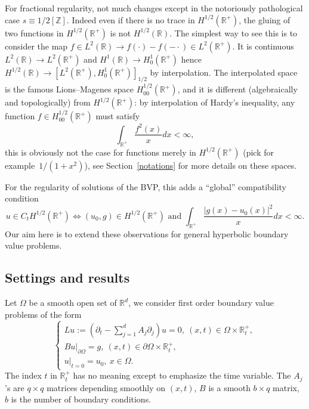 \documentclass[10pt]{amsart}
\theoremstyle{definition}\newtheorem{defi}[theo]{Definition}\newtheorem{rema}[theo]{Remark}\newtheorem{exam}[theo]{Example}\newtheorem{exem}[theo]{Example}\newtheorem{nota}[theo]{Notation}
\newcommand{\R}{\mathbb{R}}
\newcommand{\Z}{\mathbb{Z}}
\begin{document}
For fractional regularity, not much changes except in the notoriously pathological case $s\equiv 1/2[\Z]$. Indeed even if there is no trace in $H^{1/2}(\R^+)$, the gluing of two functions in $H^{1/2}(\R^+)$ is not $H^{1/2}(\R)$. The simplest way to see this is to consider the map $f\in L^2(\R)\to f(\cdot)-f(-\cdot)\in L^2(\R^+)$. It is continuous $L^2(\R)\to L^2(\R^+)$ and $H^1(\R)\to H^1_0(\R^+)$ hence $H^{1/2}(\R)\to [L^2(\R^+),H^1_0(\R^+)]_{1/2}$ by interpolation. The interpolated space is the famous Lions--Magenes space $H^{1/2}_{00}(\R^+)$, and it is different (algebraically and topologically) from $H^{1/2}(\R^+)$: by interpolation of Hardy's inequality, any function $f\in H^{1/2}_{00}(\R^+)$ must satisfy
\[
\int_{\R^+}\frac{f^2(x)}{x}dx<\infty,
\]
this is obviously not the case for functions merely in $H^{1/2}(\R^+)$ (pick for example~$1/(1+x^2)$), see Section~\ref{notations} for more details on these spaces.


For the regularity of solutions of the BVP, this adds a ``global'' compatibility condition
\[
u\in C_tH^{1/2}(\R^+)\Leftrightarrow (u_0,g)\in H^{1/2}(\R^+)\text{ and }
\int_{\R^+}\frac{|g(x)-u_0(x)|^2}{x}dx<\infty.
\]
Our aim here is to extend these observations for general hyperbolic boundary value problems.

\subsection{Settings and results}

Let $\Omega$ be a smooth open set of $\R^d$, we consider first order boundary value problems of the form
\begin{equation}\label{IBVP}
\begin{cases}
Lu:=\left(\partial_t-\sum_{j=1}^d A_j\partial_j\right)u=0,\ (x,t)\in \Omega\times \R_t^+,\\
Bu|_{\partial\Omega}=g,\ (x,t)\in \partial\Omega\times \R_t^+,\\
u|_{t=0}=u_0,\ x\in \Omega.
\end{cases}
\end{equation}
The index $t$ in $\R_t^+$ has no meaning except to emphasize the time variable. The $A_j$'s are $q\times q$ matrices depending smoothly on $(x,t)$, $B$ is a smooth $b\times q$ matrix, $b$ is the number of boundary conditions.
\end{document}
